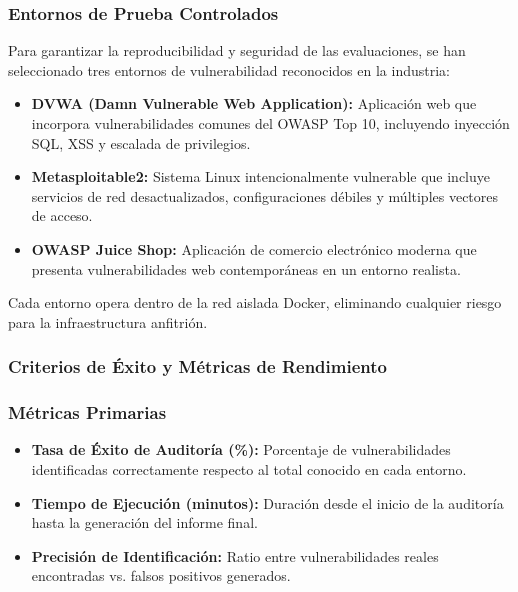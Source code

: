 \subsubsection{Entornos de Prueba Controlados}

Para garantizar la reproducibilidad y seguridad de las evaluaciones, se han seleccionado tres entornos de vulnerabilidad reconocidos en la industria:

\begin{itemize}
    \item \textbf{DVWA (Damn Vulnerable Web Application):} Aplicación web que incorpora vulnerabilidades comunes del OWASP Top 10, incluyendo inyección SQL, XSS y escalada de privilegios. %
    \item \textbf{Metasploitable2:} Sistema Linux intencionalmente vulnerable que incluye servicios de red desactualizados, configuraciones débiles y múltiples vectores de acceso. %
    \item \textbf{OWASP Juice Shop:} Aplicación de comercio electrónico moderna que presenta vulnerabilidades web contemporáneas en un entorno realista. %
\end{itemize}

Cada entorno opera dentro de la red aislada Docker, eliminando cualquier riesgo para la infraestructura anfitrión.

\subsubsection{Criterios de Éxito y Métricas de Rendimiento}

\subsubsection{Métricas Primarias}

\begin{itemize}
    \item \textbf{Tasa de Éxito de Auditoría (\%):} Porcentaje de vulnerabilidades identificadas correctamente respecto al total conocido en cada entorno.
    \item \textbf{Tiempo de Ejecución (minutos):} Duración desde el inicio de la auditoría hasta la generación del informe final.
    \item \textbf{Precisión de Identificación:} Ratio entre vulnerabilidades reales encontradas vs. falsos positivos generados.
\end{itemize}

